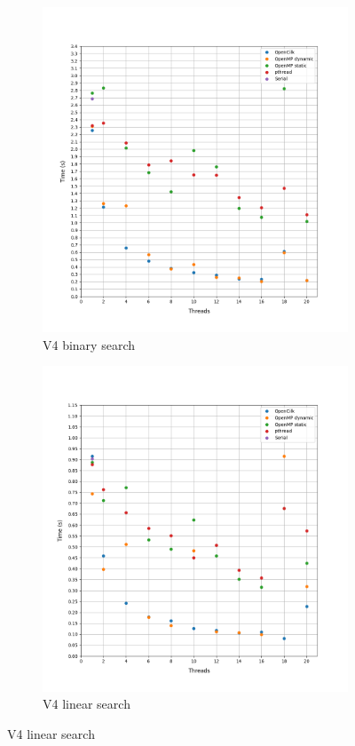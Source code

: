 \documentclass[12pt, a4paper]{article}
\begin{document}
\begin{figure}[h!]
\begin{subfigure}[b]{0.33\textwidth}
         \includegraphics[height=.4\textheight, width=\textwidth, keepaspectratio]{assets/mycielskian/v4_binary.png}
         \caption{V4 binary search}
     \end{subfigure}
     \begin{subfigure}[b]{0.33\textwidth}
         \centering
         \includegraphics[height=.4\textheight, width=\textwidth, keepaspectratio]{assets/mycielskian/v4_linear.png}
         \caption{V4 linear search} 
     \end{subfigure}
\end{figure}
\end{document}
